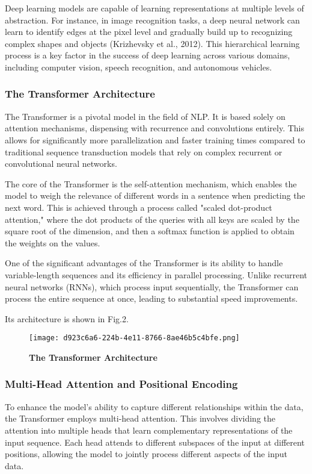 \documentclass[conference]{IEEEtran}
\begin{document}
Deep learning models are capable of learning representations at multiple levels of abstraction. For instance, in image recognition tasks, a deep neural network can learn to identify edges at the pixel level and gradually build up to recognizing complex shapes and objects (Krizhevsky et al., 2012)\cite{b63}. This hierarchical learning process is a key factor in the success of deep learning across various domains, including computer vision, speech recognition, and autonomous vehicles.

\subsubsection{The Transformer Architecture}
The Transformer is a pivotal model in the field of NLP. It is based solely on attention mechanisms, dispensing with recurrence and convolutions entirely. This allows for significantly more parallelization and faster training times compared to traditional sequence transduction models that rely on complex recurrent or convolutional neural networks.

The core of the Transformer is the self-attention mechanism, which enables the model to weigh the relevance of different words in a sentence when predicting the next word. This is achieved through a process called "scaled dot-product attention," where the dot products of the queries with all keys are scaled by the square root of the dimension, and then a softmax function is applied to obtain the weights on the values.

One of the significant advantages of the Transformer is its ability to handle variable-length sequences and its efficiency in parallel processing. Unlike recurrent neural networks (RNNs), which process input sequentially, the Transformer can process the entire sequence at once, leading to substantial speed improvements.

Its architecture is shown in Fig.2.

\begin{figure}[h]
    \centering
    \texttt{[image: d923c6a6-224b-4e11-8766-8ae46b5c4bfe.png]}
    \caption{\textbf{The Transformer Architecture}}
    \label{fig:enter-label}
\end{figure}

\subsubsection{Multi-Head Attention and Positional Encoding}
To enhance the model's ability to capture different relationships within the data, the Transformer employs multi-head attention. This involves dividing the attention into multiple heads that learn complementary representations of the input sequence. Each head attends to different subspaces of the input at different positions, allowing the model to jointly process different aspects of the input data.
\end{document}
